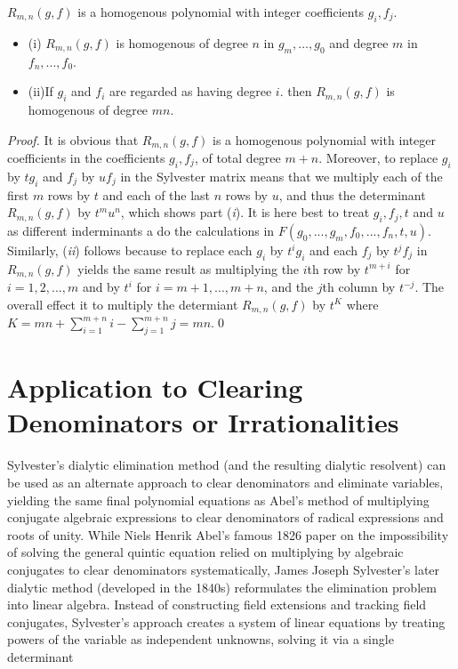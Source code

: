 \begin{theorem} $R_{m,n}(g,f)$ is a homogenous polynomial with integer coefficients $g_i,f_j$.
\begin{itemize}
\item[]{(i)} $R_{m,n}(g,f)$ is homogenous of degree $n$ in $g_m,...,g_0$ and degree $m$ in $f_n,...,f_0$.
\item[]{(ii)}If $g_i$ and $f_i$ are regarded as having degree $i$. then $R_{m,n}(g,f)$ is homogenous of degree $mn$.
\end{itemize}
\end{theorem}
\begin{proof}
It is obvious that $R_{m,n}(g,f)$ is a homogenous polynomial with integer coefficients in the coefficients $g_i, f_j$, of total degree $m+n$.
Moreover, to replace $g_i$ by $tg_i$ and $f_j$ by $uf_j$ in the Sylvester matrix means that we multiply each of the first $m$ rows by $t$
and each of the last $n$ rows by $u$, and thus the determinant $R_{m,n}(g,f)$ by $t^mu^n$, which shows part ({\it{i}}). It is here best to 
treat $g_i, f_j, t$ and $u$ as different inderminants a  do the calculations in $F(g_0,...,g_m, f_0,...,f_n, t,u)$.\\
Similarly, ({\it ii}) follows because to replace each $g_i$ by $t^ig_i$ and each $f_j$ by $t^jf_j$ in $R_{m,n}(g,f)$ yields the same result as 
multiplying the $i$th row by $t^{m+i}$ for $i=1,2,...,m$ and by $t^i$ for $i=m+1,...,m+n$, and the $j$th column by $t^{-j}$\/. The overall 
effect it to multiply the determiant $R_{m,n}(g,f)$ by $t^K$ where $K = mn+\sum_{i=1}^{m+n} i - \sum_{j=1}^{m+n} j = mn$.\qed 
\end{proof}

\section{Application to Clearing Denominators or Irrationalities}

Sylvester's dialytic elimination method (and the resulting dialytic resolvent) can be used as an alternate approach to clear denominators and eliminate variables,
yielding the same final polynomial equations as Abel's method of multiplying conjugate algebraic expressions to clear denominators of radical expressions and roots of unity.
While Niels Henrik Abel's famous 1826 paper on the impossibility of solving the general quintic equation relied on multiplying by algebraic conjugates to clear 
denominators systematically, James Joseph Sylvester's later dialytic method (developed in the 1840s) reformulates the elimination problem into linear algebra. 
Instead of constructing field extensions and tracking field conjugates, Sylvester's approach creates a system of linear equations by treating powers of the variable as independent unknowns, solving it via a single determinant

